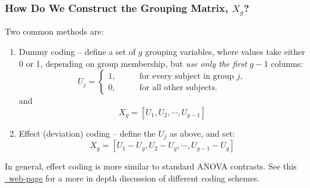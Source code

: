 \documentclass{beamer}
\begin{document}
\begin{frame}
  \frametitle{How Do We Construct the Grouping Matrix, $X_g$?}

Two common methods are:

\begin{enumerate}
\item Dummy coding -- define a set of $g$ grouping variables, where values take either 0 or 1, depending on group membership, but \emph{use only the first} $g-1$ columns:
%
\begin{equation*}
U_j = \left\{
\begin{aligned}
1, &\qquad \text{for every subject in group } j, \\
0, &\qquad \text{for all other subjects.}
\end{aligned}
\right.
\end{equation*}
and
%
$$
X_g= [U_1, U_2, \cdots, U_{g-1}]
$$
%
\item Effect (deviation) coding -- define the $U_j$ as above, and set:
$$
X_g = [U_1 - U_g, U_2-U_g, \cdots, U_{g-1} - U_g]
$$
\end{enumerate}


In general, effect coding is more similar to standard ANOVA contrasts. See this \href{http://www.ats.ucla.edu/stat/r/library/contrast_coding.htm}{\weblink\ web-page} for a more in depth discussion of different coding schemes. 

\end{frame}
\end{document}
